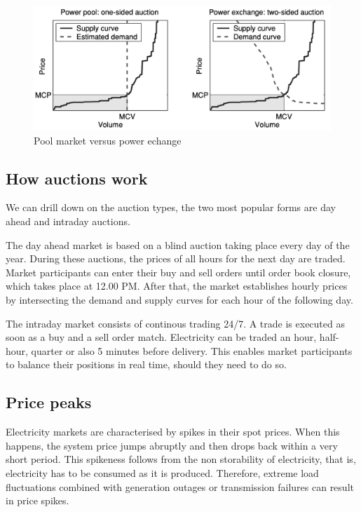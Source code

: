 \begin{figure}[!ht]
    \includegraphics[width=\textwidth]{images/pool_vs_echange.png}
    \caption{Pool market versus power echange \cite{weron2006modeling}}
    \label{fig:pool_vs_echange}
\end{figure}

\subsection{How auctions work}
We can drill down on the auction types, the two most popular forms are day ahead and intraday auctions.

The day ahead market is based on a blind auction taking place every day of the year.
During these auctions, the prices of all hours for the next day are traded.
Market participants can enter their buy and sell orders until order book closure, which takes place at 12.00 PM. After that, the market establishes hourly prices by intersecting the demand and supply curves for each hour of the following day.

The intraday market consists of continous trading 24/7. A trade is executed as soon as a buy and a sell order match. Electricity can be traded an hour, half-hour, quarter or also 5 minutes before delivery. This enables market participants to balance their positions in real time, should they need to do so.

\subsection{Price peaks}
Electricity markets are characterised by spikes in their spot prices. When this happens, the system price jumps abruptly and then drops back within a very short period.
This spikeness follows from the non storability of electricity, that is, electricity has to be consumed as it is produced. Therefore, extreme load fluctuations combined with generation outages or transmission failures can result in price spikes.

